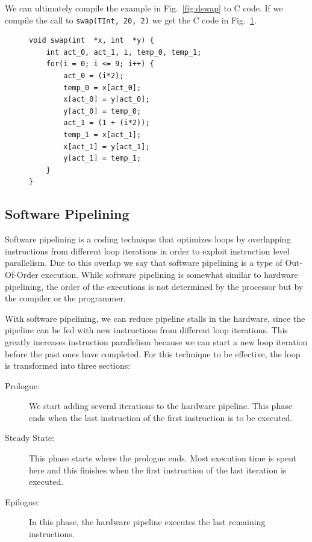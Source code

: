 \documentclass[10pt]{article}
\begin{document}
We can ultimately compile the example in Fig.~\ref{fig:dswap} to C code. If we compile the call to \texttt{swap(TInt, 20, 2)}
we get the C code in Fig.~\ref{fig:dswap_compiled}.

\lstset{basicstyle=\small,language=C}

\begin{figure}[ht]
\begin{lstlisting}
void swap(int  *x, int  *y) {
    int act_0, act_1, i, temp_0, temp_1;
    for(i = 0; i <= 9; i++) {
        act_0 = (i*2);
        temp_0 = x[act_0];
        x[act_0] = y[act_0];
        y[act_0] = temp_0;
        act_1 = (1 + (i*2));
        temp_1 = x[act_1];
        x[act_1] = y[act_1];
        y[act_1] = temp_1;
    }
}
\end{lstlisting}
\label{fig:dswap_compiled}
\end{figure}

\subsection{Software Pipelining}

Software pipelining is a coding technique that optimizes loops by overlapping instructions
from different loop iterations in order to exploit instruction level parallelism.
Due to this overlap we say that software pipelining is a type of Out-Of-Order execution.
While software pipelining is somewhat similar to hardware pipelining, the order of the executions
is not determined by the processor but by the compiler or the programmer.

With software pipelining, we can reduce
pipeline stalls in the hardware, since the pipeline can be fed with new instructions from
different loop iterations. This greatly increases instruction parallelism because we can
start a new loop iteration before the past ones have completed. For this technique to be
effective, the loop is transformed into three sections:

\begin{description}
   \item[Prologue:] We start adding several iterations to the hardware pipeline.
   This phase ends when the last instruction of the first instruction is to be executed.

   \item[Steady State:] This phase starts where the prologue ends. Most execution time is spent
   here and this finishes when the first instruction of the last iteration is executed.

   \item[Epilogue:] In this phase, the hardware pipeline executes the last remaining instructions.
\end{description}
\end{document}
